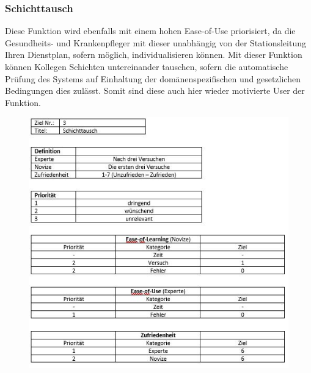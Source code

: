 \documentclass[11pt,
paper=a4,
bibtotocnumbered,	  %
liststotocnumbered,  %
DIV=calc,		  %
tablecaptionabove,	  %
headinclude,
]{article}
\begin{document}
\subsubsection{Schichttausch}
Diese Funktion wird ebenfalls mit einem hohen Ease-of-Use priorisiert, da die Gesundheits- und Krankenpfleger mit dieser unabhängig von der Stationsleitung Ihren Dienstplan, sofern möglich, individualisieren können. Mit dieser Funktion können Kollegen Schichten untereinander tauschen, sofern die automatische Prüfung des Systems auf Einhaltung der domänenspezifischen und gesetzlichen Bedingungen dies zulässt. Somit sind diese auch hier wieder motivierte User der Funktion.
\begin{figure}
\includegraphics[scale=1]{Bilder/Schichttausch.jpg}
\end{figure}
\end{document}
